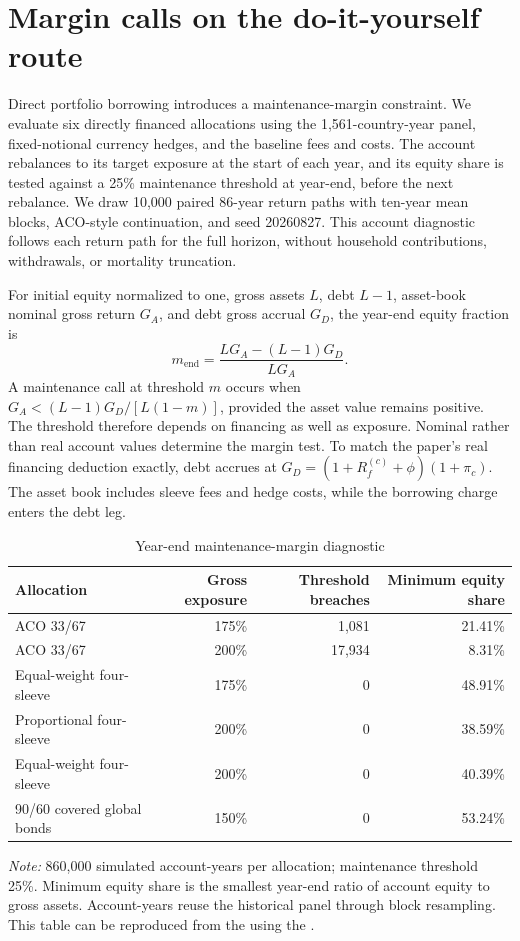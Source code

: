 \section{Margin calls on the do-it-yourself route}
\label{app:margin-call}
Direct portfolio borrowing introduces a maintenance-margin constraint.
We evaluate six directly financed allocations using the 1,561-country-year
panel, fixed-notional currency hedges, and the baseline fees and costs.
The account rebalances to its target exposure at the start of each year,
and its equity share is tested against a 25\% maintenance threshold at
year-end, before the next rebalance. We draw 10,000 paired 86-year return
paths with ten-year mean blocks, ACO-style continuation, and seed 20260827.
This account diagnostic follows each return path for the full horizon,
without household contributions, withdrawals, or mortality truncation.

For initial equity normalized to one, gross assets $L$, debt $L-1$,
asset-book nominal gross return $G_A$, and debt gross accrual $G_D$,
the year-end equity fraction is
\[
 m_{\mathrm{end}}=
 \frac{L G_A-(L-1)G_D}{L G_A}.
\]
A maintenance call at threshold $m$ occurs when
$G_A < (L-1)G_D/[L(1-m)]$, provided the asset value remains positive.
The threshold therefore depends on financing as well as exposure.
Nominal rather than real account values determine the margin test.
To match the paper's real financing deduction exactly, debt accrues at
$G_D=(1+R_f^{(c)}+\phi)(1+\pi_c)$. The asset book includes sleeve fees
and hedge costs, while the borrowing charge enters the debt leg.

\begin{table}[H]
\centering
\caption{Year-end maintenance-margin diagnostic}
\label{tab:margin-current}
\small
\begin{tabular}{lrrr}
\toprule
Allocation & Gross exposure & Threshold breaches & Minimum equity share \\
\midrule
ACO 33/67 & 175\% & 1,081 & 21.41\% \\
ACO 33/67 & 200\% & 17,934 & 8.31\% \\
Equal-weight four-sleeve & 175\% & 0 & 48.91\% \\
Proportional four-sleeve & 200\% & 0 & 38.59\% \\
Equal-weight four-sleeve & 200\% & 0 & 40.39\% \\
90/60 covered global bonds & 150\% & 0 & 53.24\% \\
\bottomrule
\end{tabular}
\par\smallskip\begin{minipage}{0.95\textwidth}\footnotesize
\textit{Note:} 860,000 simulated account-years per allocation; maintenance
threshold 25\%. Minimum equity share is the smallest year-end ratio of
account equity to gross assets. Account-years reuse the historical panel
through block resampling. This table can be reproduced from the
 using the
.
\end{minipage}
\end{table}

